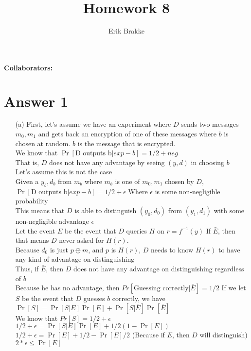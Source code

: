 \documentclass[11pt]{article}
\providecommand{\myparab}[1]{\smallskip\noindent\textbf{#1} }
\theoremstyle{definition}
\begin{document}
\title{Homework 8}
\author{Erik Brakke}
\maketitle

\thispagestyle{fancy}

\myparab{Collaborators: }
 
 
\section*{Answer 1}
\begin{enumerate}
	\item[(a)] First, let's assume we have an experiment where $D$ sends two messages $m_0,m_1$ and gets back an encryption of one of these messages where $b$ is chosen at random.  $b$ is the message that is encrypted.\\
We know that $\Pr[\text{D outputs b} | exp-b] = 1/2 + neg$\\
That is, $D$ does not have any advantage by seeing $(y,d)$ in choosing $b$\\
Let's assume this is not the case\\
Given a $y_b,d_b$ from $m_b$ where $m_b$ is one of $m_0,m_1$ chosen by $D$, $\Pr[\text{D outputs b}|exp-b] = 1/2 + \epsilon$ Where $\epsilon$ is some non-negligible probability\\
This means that $D$ is able to distinguish $(y_0,d_0)$ from $(y_1,d_1)$ with some non-negligible advantage $\epsilon$\\
Let the event $E$ be the event that $D$ queries $H$ on $r = f^{-1}(y)$
If $\bar{E}$, then that means $D$ never asked for $H(r)$.\\
Because $d_0$ is just $p \oplus m$, and $p$ is $H(r)$, $D$ needs to know $H(r)$ to have any kind of advantage on distinguishing\\
Thus, if $\bar{E}$, then $D$ does not have any advantage on distinguishing regardless of $b$\\
Because he has no advantage, then $Pr[\text{Guessing correctly} | \bar{E}] = 1/2$
If we let $S$ be the event that $D$ guesses $b$ correctly, we have $\Pr[S] = \Pr[S|E]\Pr[E] + \Pr[S|\bar{E}]\Pr[\bar{E}]$\\
We know that $Pr[S] = 1/2 + \epsilon$\\
$1/2 + \epsilon = \Pr[S|E]\Pr[E] + 1/2(1 - \Pr[E])$\\
$1/2 + \epsilon = \Pr[E] + 1/2 - \Pr[E]/2$ (Because if $E$, then $D$ will distinguish)\\
$2*\epsilon \le \Pr[E]$


\end{enumerate}
\end{document}
